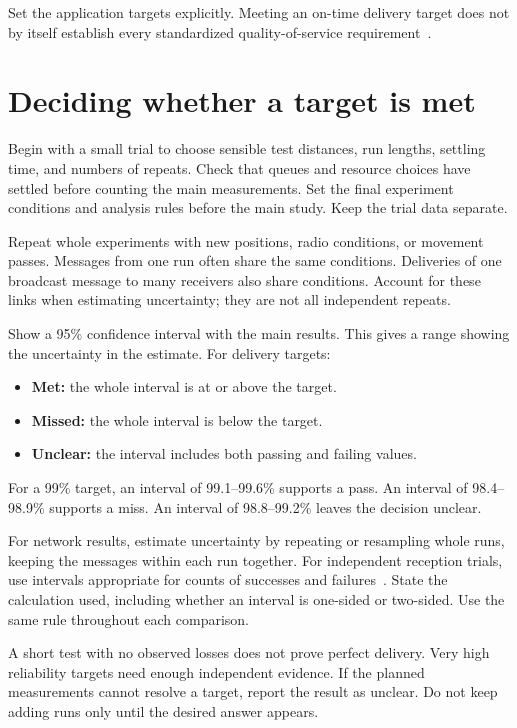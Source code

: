 \documentclass[11pt,a4paper]{article}
\begin{document}
Set the application targets explicitly. Meeting an on-time delivery target
does not by itself establish every standardized quality-of-service
requirement~\cite{ts23287,ts23501}.

\section{Deciding whether a target is met}

Begin with a small trial to choose sensible test distances, run lengths,
settling time, and numbers of repeats. Check that queues and resource choices
have settled before counting the main measurements. Set the final experiment
conditions and analysis rules before the main study. Keep the trial data
separate.

Repeat whole experiments with new positions, radio conditions, or movement
passes. Messages from one run often share the same conditions. Deliveries of
one broadcast message to many receivers also share conditions. Account for
these links when estimating uncertainty; they are not all independent repeats.

Show a 95\% confidence interval with the main results. This gives a range
showing the uncertainty in the estimate. For delivery targets:
\begin{itemize}
  \item \textbf{Met:} the whole interval is at or above the target.
  \item \textbf{Missed:} the whole interval is below the target.
  \item \textbf{Unclear:} the interval includes both passing and failing values.
\end{itemize}

For a 99\% target, an interval of 99.1--99.6\% supports a pass.
An interval of 98.4--98.9\% supports a miss. An interval of 98.8--99.2\%
leaves the decision unclear.

For network results, estimate uncertainty by repeating or resampling whole
runs, keeping the messages within each run together. For independent reception
trials, use intervals appropriate for counts of successes and failures~\cite{nist}.
State the calculation used, including whether an interval is one-sided or
two-sided. Use the same rule throughout each comparison.

A short test with no observed losses does not prove perfect delivery.
Very high reliability targets need enough independent evidence. If the
planned measurements cannot resolve a target, report the result as unclear.
Do not keep adding runs only until the desired answer appears.
\end{document}
